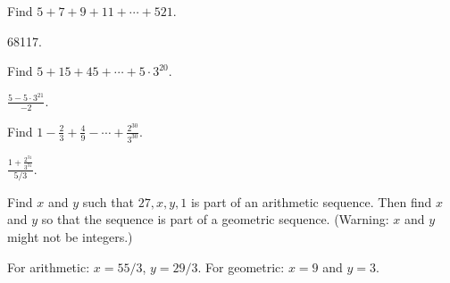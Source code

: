 \begin{questions}
	\begin{answer}
	\end{answer}






\question Find $5 + 7 + 9 + 11+ \cdots + 521$.

	\begin{answer}
		68117.
	\end{answer}





\question Find $5 + 15 + 45 + \cdots + 5\cdot 3^{20}$.

	\begin{answer}
		$\frac{5-5\cdot 3^{21}}{-2}$.
	\end{answer}





\question Find $1 - \frac{2}{3} + \frac{4}{9} - \cdots + \frac{2^{30}}{3^{30}}$.

	\begin{answer}
		$\frac{1 + \frac{2^{31}}{3^{31}}}{5/3}$.
	\end{answer}





\question Find $x$ and $y$ such that $27, x, y, 1$ is part of an arithmetic sequence.  Then find $x$ and $y$ so that the sequence is part of a geometric sequence.  (Warning: $x$ and $y$ might not be integers.)

	\begin{answer}
		For arithmetic: $x = 55/3$, $y = 29/3$.  For geometric: $x = 9$ and $y = 3$.
	\end{answer}





\end{questions}
